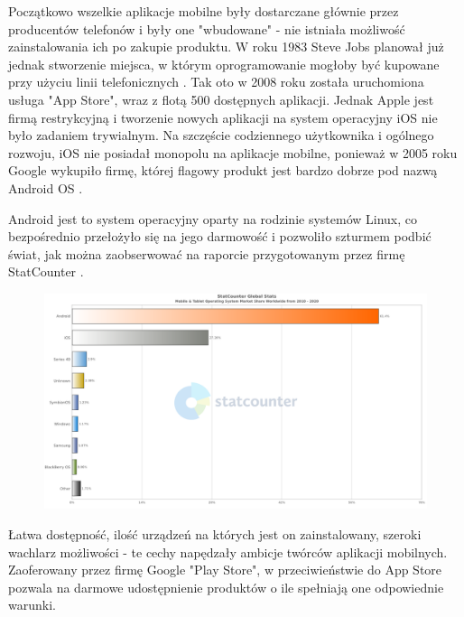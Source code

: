 \documentclass[12pt, a4paper]{article}
\begin{document}
\begin{sloppypar}
{{    Początkowo wszelkie aplikacje mobilne były dostarczane głównie przez producentów
    telefonów i były one "wbudowane" - nie istniała możliwość zainstalowania
    ich po zakupie produktu. W roku 1983 Steve Jobs planował już jednak stworzenie
    miejsca, w którym oprogramowanie mogłoby być kupowane przy użyciu linii
    telefonicznych \cite{history4}. Tak oto w 2008 roku została uruchomiona usługa
    "App Store", wraz z flotą 500 dostępnych aplikacji. Jednak Apple jest firmą
    restrykcyjną i tworzenie nowych aplikacji na system operacyjny iOS nie było 
    zadaniem trywialnym. Na szczęście codziennego użytkownika i ogólnego rozwoju, 
    iOS nie posiadał monopolu na aplikacje mobilne, ponieważ w 2005 roku Google
    wykupiło firmę, której flagowy produkt jest bardzo dobrze pod nazwą Android OS
    \cite{history3}.

    Android jest to system operacyjny oparty na rodzinie systemów Linux, co bezpośrednio
    przełożyło się na jego darmowość i pozwoliło szturmem podbić świat, jak można
    zaobserwować na raporcie przygotowanym przez firmę StatCounter \cite{os}.
    \begin{figure}[H]
      \centering
      \includegraphics[width=.9\textwidth]{android_chart.png}
      \label{fig:android}
    \end{figure}
    Łatwa dostępność, ilość urządzeń na których jest on zainstalowany, szeroki wachlarz
    możliwości - te cechy napędzały ambicje twórców aplikacji mobilnych. Zaoferowany
    przez firmę Google "Play Store", w przeciwieństwie do App Store pozwala na darmowe
    udostępnienie produktów o ile spełniają one odpowiednie warunki.

}}
\end{sloppypar}
\end{document}
